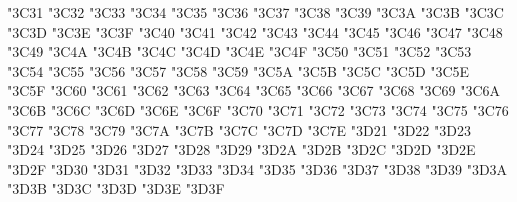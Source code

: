 {\Uchar\jis"3C31 %
\Uchar\jis"3C32 %
\Uchar\jis"3C33 %
\Uchar\jis"3C34 %
\Uchar\jis"3C35 %
\Uchar\jis"3C36 %
\Uchar\jis"3C37 %
\Uchar\jis"3C38 %
\Uchar\jis"3C39 %
\Uchar\jis"3C3A %
\Uchar\jis"3C3B %
\Uchar\jis"3C3C %
\Uchar\jis"3C3D %
\Uchar\jis"3C3E %
\Uchar\jis"3C3F %
\Uchar\jis"3C40 %
\Uchar\jis"3C41 %
\Uchar\jis"3C42 %
\Uchar\jis"3C43 %
\Uchar\jis"3C44 %
\Uchar\jis"3C45 %
\Uchar\jis"3C46 %
\Uchar\jis"3C47 %
\Uchar\jis"3C48 %
\Uchar\jis"3C49 %
\Uchar\jis"3C4A %
\Uchar\jis"3C4B %
\Uchar\jis"3C4C %
\Uchar\jis"3C4D %
\Uchar\jis"3C4E %
\Uchar\jis"3C4F %
\Uchar\jis"3C50 %
\Uchar\jis"3C51 %
\Uchar\jis"3C52 %
\Uchar\jis"3C53 %
\Uchar\jis"3C54 %
\Uchar\jis"3C55 %
\Uchar\jis"3C56 %
\Uchar\jis"3C57 %
\Uchar\jis"3C58 %
\Uchar\jis"3C59 %
\Uchar\jis"3C5A %
\Uchar\jis"3C5B %
\Uchar\jis"3C5C %
\Uchar\jis"3C5D %
\Uchar\jis"3C5E %
\Uchar\jis"3C5F %
\Uchar\jis"3C60 %
\Uchar\jis"3C61 %
\Uchar\jis"3C62 %
\Uchar\jis"3C63 %
\Uchar\jis"3C64 %
\Uchar\jis"3C65 %
\Uchar\jis"3C66 %
\Uchar\jis"3C67 %
\Uchar\jis"3C68 %
\Uchar\jis"3C69 %
\Uchar\jis"3C6A %
\Uchar\jis"3C6B %
\Uchar\jis"3C6C %
\Uchar\jis"3C6D %
\Uchar\jis"3C6E %
\Uchar\jis"3C6F %
\Uchar\jis"3C70 %
\Uchar\jis"3C71 %
\Uchar\jis"3C72 %
\Uchar\jis"3C73 %
\Uchar\jis"3C74 %
\Uchar\jis"3C75 %
\Uchar\jis"3C76 %
\Uchar\jis"3C77 %
\Uchar\jis"3C78 %
\Uchar\jis"3C79 %
\Uchar\jis"3C7A %
\Uchar\jis"3C7B %
\Uchar\jis"3C7C %
\Uchar\jis"3C7D %
\Uchar\jis"3C7E %
\Uchar\jis"3D21 %
\Uchar\jis"3D22 %
\Uchar\jis"3D23 %
\Uchar\jis"3D24 %
\Uchar\jis"3D25 %
\Uchar\jis"3D26 %
\Uchar\jis"3D27 %
\Uchar\jis"3D28 %
\Uchar\jis"3D29 %
\Uchar\jis"3D2A %
\Uchar\jis"3D2B %
\Uchar\jis"3D2C %
\Uchar\jis"3D2D %
\Uchar\jis"3D2E %
\Uchar\jis"3D2F %
\Uchar\jis"3D30 %
\Uchar\jis"3D31 %
\Uchar\jis"3D32 %
\Uchar\jis"3D33 %
\Uchar\jis"3D34 %
\Uchar\jis"3D35 %
\Uchar\jis"3D36 %
\Uchar\jis"3D37 %
\Uchar\jis"3D38 %
\Uchar\jis"3D39 %
\Uchar\jis"3D3A %
\Uchar\jis"3D3B %
\Uchar\jis"3D3C %
\Uchar\jis"3D3D %
\Uchar\jis"3D3E %
\Uchar\jis"3D3F %
}
